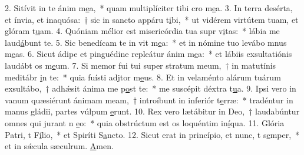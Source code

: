 2. Sitívit in te ánim m\uline{e}a,~* quam multiplíciter tibi cro m\uline{e}a.
3. In terra desérta, et ínvia, et inaquósa:~† sic in sancto appáru t\uline{i}bi,~* ut vidérem virtútem tuam, et glóram t\uline{u}am.
4. Quóniam mélior est misericórdia tua supr v\uline{i}tas:~* lábia me laud\uline{á}bunt te.
5. Sic benedícam te in vit m\uline{e}a:~* et in nómine tuo levábo mnus m\uline{e}as.
6. Sicut ádipe et pinguédine repleátur ánim m\uline{e}a:~* et lábiis exsultatiónis laudábt os m\uline{e}um.
7. Si memor fui tui super stratum meum,~† in matutínis meditábr \uline{i}n te:~* quia fuísti adjtor m\uline{e}us.
8. Et in velaménto alárum tuárum exsultábo,~† adhǽsit ánima me p\uline{o}st te:~* me suscépit déxtra t\uline{u}a.
9. Ipsi vero in vanum quæsiérunt ánimam meam,~† introíbunt in inferiór t\uline{e}rræ:~* tradéntur in manus gládii, partes vúlpum \uline{e}runt.
10. Rex vero lætábitur in Deo,~† laudabúntur omnes qui jurant n \uline{e}o:~* quia obstrúctum est os loquéntim in\uline{í}qua.
11. Glória Patri, t F\uline{í}lio,~* et Spiríti S\uline{a}ncto.
12. Sicut erat in princípio, et nunc, t s\uline{e}mper,~* et in sǽcula sæculrum. \uline{A}men.
